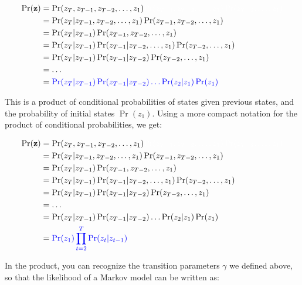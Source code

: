 \documentclass[
  12pt,
]{krantz}
\begin{document}
\begin{align*}
\Pr(\mathbf{z}) &= \Pr(z_T, z_{T-1}, z_{T-2}, \ldots, z_1) \color{white}{\Pr(z_{T-1}, z_{T-2},\ldots, z_1) \Pr(z_{T-2}, \ldots, z_1)}\\
                &= \Pr(z_T | z_{T-1}, z_{T-2},\ldots, z_1) \Pr(z_{T-1}, z_{T-2},\ldots, z_1) \\
                &= \Pr(z_T | z_{T-1}) \Pr(z_{T-1}, z_{T-2},\ldots, z_1) \\
                &= \Pr(z_T | z_{T-1}) \Pr(z_{T-1} | z_{T-2}, \ldots, z_1) \Pr(z_{T-2}, \ldots, z_1)\\
                &= \Pr(z_T | z_{T-1}) \Pr(z_{T-1} | z_{T-2}) \Pr(z_{T-2}, \ldots, z_1)\\
                &= \ldots \\
                &= \color{blue}{\Pr(z_T | z_{T-1}) \Pr(z_{T-1} | z_{T-2}) \ldots \Pr(z_{2} | z_{1}) \Pr(z_{1})}\\
\end{align*}

This is a product of conditional probabilities of states given previous states, and the probability of initial states \(\Pr(z_1)\). Using a more compact notation for the product of conditional probabilities, we get:

\begin{align*}
\Pr(\mathbf{z}) &= \Pr(z_T, z_{T-1}, z_{T-2}, \ldots, z_1) \color{white}{\Pr(z_{T-1}, z_{T-2},\ldots, z_1) \Pr(z_{T-2}, \ldots, z_1)}\\
                &= \Pr(z_T | z_{T-1}, z_{T-2},\ldots, z_1) \Pr(z_{T-1}, z_{T-2},\ldots, z_1) \\
                &= \Pr(z_T | z_{T-1}) \Pr(z_{T-1}, z_{T-2},\ldots, z_1) \\
                &= \Pr(z_T | z_{T-1}) \Pr(z_{T-1} | z_{T-2}, \ldots, z_1) \Pr(z_{T-2}, \ldots, z_1)\\
                &= \Pr(z_T | z_{T-1}) \Pr(z_{T-1} | z_{T-2}) \Pr(z_{T-2}, \ldots, z_1)\\
                &= \ldots \\
                &= \Pr(z_T | z_{T-1}) \Pr(z_{T-1} | z_{T-2}) \ldots \Pr(z_{2} | z_{1}) \Pr(z_{1})\\
                &= \color{blue}{\Pr(z_{1}) \prod_{t=2}^T{\Pr(z_{t} | z_{t-1})}}\\
\end{align*}

In the product, you can recognize the transition parameters \(\gamma\) we defined above, so that the likelihood of a Markov model can be written as:
\end{document}
